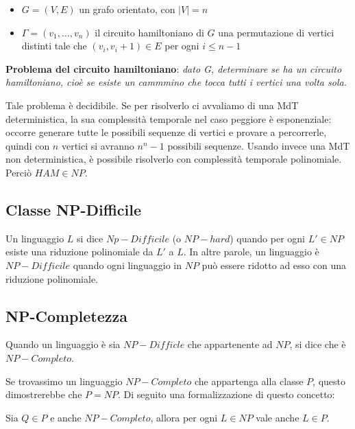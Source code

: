 \begin{itemize}
	\item $G = (V, E)$ un grafo orientato, con $|V| = n$
	\item $\Gamma = (v_1, \ldots, v_n)$ il circuito hamiltoniano di $G$
		\subitem una permutazione di vertici distinti tale che $(v_i, v_i+1) \in E$ per ogni $i \leq n-1$
\end{itemize}

\noindent\textbf{Problema del circuito hamiltoniano}: \textit{dato G, determinare se ha un circuito hamiltoniano, cioè se esiste un cammmino che tocca tutti i vertici una volta sola.}

Tale problema è decidibile. Se per risolverlo ci avvaliamo di una MdT deterministica, la sua complessità temporale nel caso peggiore è esponenziale: occorre generare tutte le possibili sequenze di vertici e provare a percorrerle, quindi con $n$ vertici si avranno $n^n-1$ possibili sequenze. Usando invece una MdT non deterministica, è possibile risolverlo con complessità temporale polinomiale. Perciò $HAM \in NP$.

\subsection{Classe NP-Difficile}

\begin{defn}
	Un linguaggio $L$ si dice $Np-Difficile$ (o $NP-hard$) quando per ogni $L' \in NP$ esiste una riduzione polinomiale da $L'$ a $L$. In altre parole, un linguaggio è $NP-Difficile$ quando ogni linguaggio in $NP$ può essere ridotto ad esso con una riduzione polinomiale.
\end{defn}

\subsection{NP-Completezza}

\begin{defn}
	Quando un linguaggio è sia $NP-Difficle$ che appartenente ad $NP$, si dice che è $NP-Completo$.
\end{defn}

Se trovassimo un linguaggio $NP-Completo$ che appartenga alla classe $P$, questo dimostrerebbe che $P = NP$. Di seguito una formalizzazione di questo concetto: \\

\begin{lemm}
	Sia $Q \in P$ e anche $NP-Completo$, allora per ogni $L \in NP$ vale anche $L \in P$.
\end{lemm}

